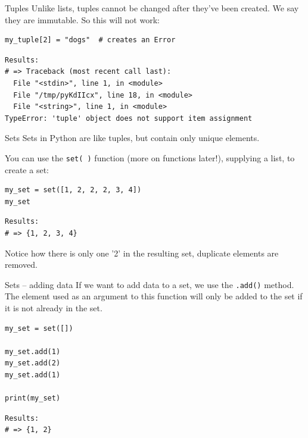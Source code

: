 \documentclass[10pt]{beamer}
\begin{document}
\begin{frame}[label={sec:orgcc4254f},fragile]{Tuples}
 Unlike lists, tuples cannot be changed after they've been created. We say they are
\alert{immutable}. So this will \alert{not} work:

\begin{verbatim}
my_tuple[2] = "dogs"  # creates an Error
\end{verbatim}

\begin{verbatim}
Results: 
# => Traceback (most recent call last):
  File "<stdin>", line 1, in <module>
  File "/tmp/pyKdIIcx", line 18, in <module>
  File "<string>", line 1, in <module>
TypeError: 'tuple' object does not support item assignment
\end{verbatim}
\end{frame}

\begin{frame}[label={sec:org6c651ae},fragile]{Sets}
 Sets in Python are like tuples, but contain only unique elements.

You can use the \texttt{set( )} function (\alert{more on functions later!}), supplying a list, to create a set:

\begin{verbatim}
my_set = set([1, 2, 2, 2, 3, 4])
my_set
\end{verbatim}

\begin{verbatim}
Results: 
# => {1, 2, 3, 4}
\end{verbatim}


Notice how there is only one '2' in the resulting set, duplicate elements are removed.
\end{frame}

\begin{frame}[label={sec:org69282c8},fragile]{Sets -- adding data}
 If we want to add data to a set, we use the \texttt{.add()} method. The element used as an
argument to this function will only be added to the set if it is not already in the
set.

\begin{verbatim}
my_set = set([])

my_set.add(1)
my_set.add(2)
my_set.add(1)

print(my_set)
\end{verbatim}

\begin{verbatim}
Results: 
# => {1, 2}
\end{verbatim}
\end{frame}
\end{document}
